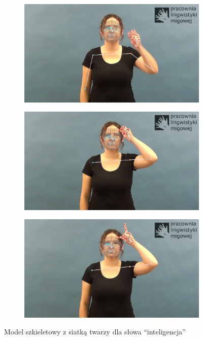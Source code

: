 \begin{figure}[H]
    \centering
    \begin{subfigure}{0.3\textwidth}
        \centering
        \includegraphics[width=\textwidth]{figures/intelligence-1}
        \caption{\hampinchonetwo\hamextfingeru}
        \label{fig:intelligence-1}
    \end{subfigure}
    \hfill
    \begin{subfigure}{0.3\textwidth}
        \centering
        \includegraphics[width=\textwidth]{figures/intelligence-2}
        \caption{\hampalml\hamforehead\hamlrat\hamtouch}
        \label{fig:intelligence-2}
    \end{subfigure}
    \hfill
    \begin{subfigure}{0.3\textwidth}
        \centering
        \includegraphics[width=\textwidth]{figures/intelligence-3}
        \caption{\hamreplace\hamfingertwo\hamthumbopenmod}
        \label{fig:intelligence-3}
    \end{subfigure}
    \caption{Model szkieletowy z siatką twarzy dla słowa \enquote{inteligencja}}
    \label{fig:intelligence}
\end{figure}
